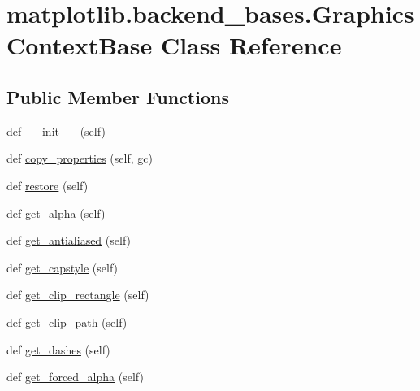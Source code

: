 \hypertarget{classmatplotlib_1_1backend__bases_1_1GraphicsContextBase}{}\section{matplotlib.\+backend\+\_\+bases.\+Graphics\+Context\+Base Class Reference}
\label{classmatplotlib_1_1backend__bases_1_1GraphicsContextBase}
\subsection*{Public Member Functions}
\begin{DoxyCompactItemize}
\item 
def \hyperlink{classmatplotlib_1_1backend__bases_1_1GraphicsContextBase_a99f37185dc3ce6c60aa8dbf25661f83a}{\+\_\+\+\_\+init\+\_\+\+\_\+} (self)
\item 
def \hyperlink{classmatplotlib_1_1backend__bases_1_1GraphicsContextBase_addba8c767b5e4700e569e05756672f15}{copy\+\_\+properties} (self, gc)
\item 
def \hyperlink{classmatplotlib_1_1backend__bases_1_1GraphicsContextBase_acca6c45b2cc344fd587445ebfdc3d406}{restore} (self)
\item 
def \hyperlink{classmatplotlib_1_1backend__bases_1_1GraphicsContextBase_ad3c2b8ebd879253bdd6e703972c7910b}{get\+\_\+alpha} (self)
\item 
def \hyperlink{classmatplotlib_1_1backend__bases_1_1GraphicsContextBase_a427764bfa197384658980e043c95d2fa}{get\+\_\+antialiased} (self)
\item 
def \hyperlink{classmatplotlib_1_1backend__bases_1_1GraphicsContextBase_a2289a8450ea666719b87da01d4ecba06}{get\+\_\+capstyle} (self)
\item 
def \hyperlink{classmatplotlib_1_1backend__bases_1_1GraphicsContextBase_ac501b7d24097daeb320867cae109e9ac}{get\+\_\+clip\+\_\+rectangle} (self)
\item 
def \hyperlink{classmatplotlib_1_1backend__bases_1_1GraphicsContextBase_ab403067731b04c241ab054e7f70325cc}{get\+\_\+clip\+\_\+path} (self)
\item 
def \hyperlink{classmatplotlib_1_1backend__bases_1_1GraphicsContextBase_a6ede5ae97852025e120170a7ad5023a3}{get\+\_\+dashes} (self)
\item 
def \hyperlink{classmatplotlib_1_1backend__bases_1_1GraphicsContextBase_a719e6ad65c10d653c2c21c30631239e7}{get\+\_\+forced\+\_\+alpha} (self)

\end{DoxyCompactItemize}
